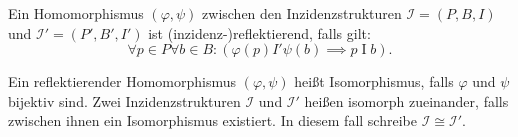 \documentclass{article}
\begin{document}
\begin{definition}
  Ein Homomorphismus $(\varphi, \psi)$ zwischen den Inzidenzstrukturen $\mathcal{I} = (P, B, I)$
  und $\mathcal{I}' = (P', B', I')$ ist (inzidenz-)reflektierend,
  falls gilt:
  \begin{equation*}
    \forall p \in P \forall b \in B \colon (\varphi(p) \mathrel{I'} \psi(b) \implies p \mathrel{I} b).
  \end{equation*}
\end{definition}

\begin{definition}
    Ein reflektierender Homomorphismus $(\varphi, \psi)$ heißt Isomorphismus, 
    falls $\varphi$ und $\psi$ bijektiv sind.
    Zwei Inzidenzstrukturen $\mathcal{I}$ und $\mathcal{I}'$ heißen isomorph zueinander, 
    falls zwischen ihnen ein Isomorphismus existiert.
    In diesem fall schreibe $\mathcal{I} \cong \mathcal{I}'$.
\end{definition}
\end{document}
